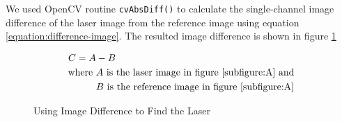 We used OpenCV routine \texttt{cvAbsDiff()} to calculate the single-channel image difference of the laser image from the reference image using equation \ref{equation:difference-image}. The resulted image difference is shown in figure \ref{figure:difference-image}

\begin{align}
	\label{equation:difference-image}				
	C = A &- B \\
	\text{where}~ 
	&A~ \text{is the laser image in figure \ref{subfigure:A} and} \notag \\
	&B~ \text{is the reference image in figure \ref{subfigure:A}} \notag
\end{align}


\begin{figure}[h!]
\centering
{} \hfill
{} \hfill
{} \hfill
\label{figure:difference-image}
\caption{Using Image Difference to Find the Laser}
\end{figure}



